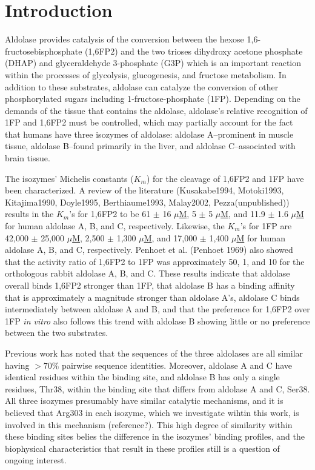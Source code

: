 \documentclass[11pt,a4paper]{article}
\begin{document}
\section{Introduction}
	Aldolase provides catalysis of the conversion between the hexose 1,6-fructosebisphosphate (1,6FP2) and the two trioses dihydroxy acetone phosphate (DHAP) 
	and glyceraldehyde 3-phosphate (G3P) which is an important reaction within the processes of glycolysis, glucogenesis, and fructose metabolism.  In addition to these
	substrates, aldolase can catalyze the conversion of other phosphorylated sugars including 1-fructose-phosphate (1FP).  Depending on the 
	demands of the tissue that contains the aldolase, aldolase's relative recognition of 1FP and 1,6FP2 must be controlled, which may partially account for
	the fact that humans have three isozymes of aldolase: aldolase A--prominent in muscle tissue, aldolase B--found primarily in the liver, and
        aldolase C--associated with brain tissue.	
	
	The isozymes' Michelis constants ($K_m$) for the cleavage of 1,6FP2 and 1FP have been characterized.  A review of the literature (Kusakabe1994, Motoki1993,
	Kitajima1990, Doyle1995, Berthiaume1993, Malay2002, Pezza(unpublished)) results in 
	the $K_m$'s for 1,6FP2 to be 61 $\pm$ 16 $\mu$\underline{M}, 5 $\pm$ 5 $\mu$\underline{M}, and 11.9 $\pm$ 1.6 $\mu$\underline{M} for human
	aldolase A, B, and C, respectively.  Likewise, the $K_m$'s for 1FP are 42,000 $\pm$ 25,000 $\mu$\underline{M}, 2,500 $\pm$ 1,300 $\mu$\underline{M},
	and 17,000 $\pm$ 1,400 $\mu$\underline{M} for human aldolase A, B, and C, respectively.  Penhoet et al. (Penhoet 1969) also showed that the activity ratio of 
	1,6FP2 to 1FP was approximately 50, 1, and 10 for the orthologous rabbit aldolase A, B, and C.  These results indicate that aldolase overall 
	binds 1,6FP2 stronger than 1FP, that aldolase B has a binding affinity that is approximately a magnitude stronger than aldolase A's, aldolase C binds 
	intermediately between aldolase A and B, and that the preference for 1,6FP2 over 1FP \textit{in vitro} also
	follows this trend with aldolase B showing little or no preference between the two substrates.

	Previous work has noted that the sequences of the three aldolases are all similar having $> 70\%$ pairwise sequence identities.  
	Moreover, aldolase A and C have identical residues within the binding site, and aldolase B has only a single residues, Thr38,
        within the binding site that differs from aldolase A and C, Ser38.  All three isozymes presumably
	have similar catalytic mechanisms, and it is believed that Arg303 in each isozyme, which we investigate wihtin this work, is involved
	in this mechanism (reference?).  This high degree of similarity within these binding sites belies the difference
	in the isozymes' binding profiles, and the biophysical characteristics that result in these profiles still is a question of ongoing interest.
\end{document}
